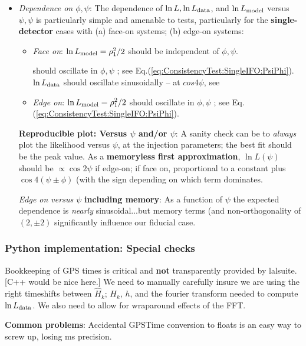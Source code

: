\documentclass[twocolumn,prd,nofootinbib]{revtex4}
\begin{document}
\begin{widetext}
\begin{widetext}
\begin{itemize}
\item \emph{Dependence on $\phi,\psi$}: The dependence of $\ln L, \ln L_{\rm data}$, and $\ln L_{\rm model}$ versus
  $\psi,\psi$ is particularly simple and amenable to tests, particularly for the \textbf{single-detector} cases with (a) face-on systems; (b) edge-on systems:
\begin{itemize}
\item \emph{Face on}: $\ln L_{\rm model} = \rho_1^2/2 $ should be independent of $\phi,\psi$.  

should oscillate in $\phi,\psi$ ; see
  Eq.(\ref{eq:ConsistencyTest:SingleIFO:PsiPhi}).  
$\ln L_{\rm data}$ should oscillate
  sinusoidally -- at $cos 4\psi$, see 
\item \emph{Edge on}: $\ln L_{\rm model} = \rho_1^2/2 $ should oscillate in $\phi,\psi$ ; see
  Eq.(\ref{eq:ConsistencyTest:SingleIFO:PsiPhi}).  
\end{itemize}

\begin{shaded}

\noindent \textbf{Reproducible plot: Versus $\psi$ and/or $\psi$}: A sanity check can be to \emph{always} plot the likelihood versus
$\psi$, at the injection parameters; the best fit should be the peak value.  As a \textbf{memoryless
  first approximation}, $\ln L(\psi)$ should be $\propto \cos 2\psi$ if edge-on; if face on, proportional to a constant
 plus $\cos 4(\psi \pm \phi)$ (with the sign depending on which term dominates.


\noindent \emph{Edge on versus $\psi$} \textbf{including memory}: As a function of $\psi$  the expected dependence is
\emph{nearly} sinusoidal...but memory terms (and non-orthogonality of $(2,\pm 2)$  significantly influence our fiducial case.


\end{shaded}
\end{itemize}



\subsubsection{Python implementation: Special checks}

Bookkeeping of GPS times is critical and
\textbf{not} transparently provided by lalsuite.  [C++ would be nice here.]  We need to
manually carefully insure we are using the right timeshifts between $\hat{H}_k$; $H_k$,
$h$, and the fourier transform needed to compute $\ln L_{\rm data}$.    We also need to allow for wraparound effects of
the FFT.
%
\begin{shaded}
\noindent \textbf{Common problems}: Accidental  GPSTime conversion to floats is an easy way to screw up, losing ms precision.
\end{shaded}



\end{widetext}
\end{widetext}
\end{document}

